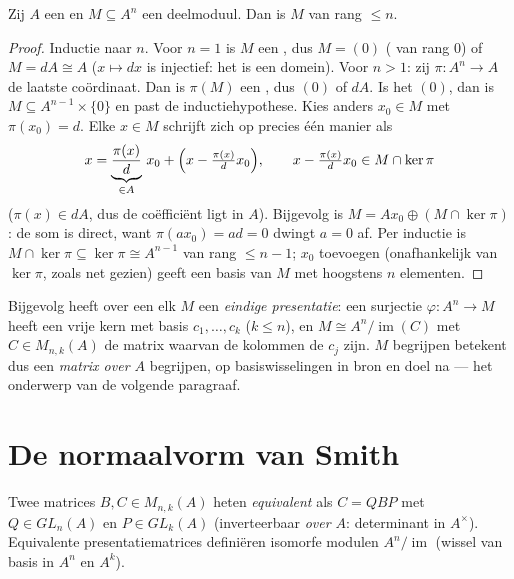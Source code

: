 \begin{theorem}\label{thm:b3:modules:submodule}
Zij $A$ een  en $M \subseteq A^n$ een deelmoduul.
Dan is $M$  van rang $\leq n$.
\end{theorem}

\begin{proof}
Inductie naar $n$. Voor $n = 1$ is $M$ een , dus $M = (0)$
( van rang $0$) of $M = dA \cong A$ ($x \mapsto dx$ is
injectief: het is een domein). Voor $n > 1$: zij $\pi \colon A^n
\to A$ de laatste coördinaat. Dan is $\pi(M)$ een , dus $(0)$
of $dA$. Is het $(0)$, dan is $M \subseteq A^{n-1} \times \{0\}$ en
past de inductiehypothese. Kies anders $x_0 \in M$ met $\pi(x_0) =
d$. Elke $x \in M$ schrijft zich op precies één manier als
\[
x = \underbrace{\frac{\pi(x)}{d}}_{\in A}\, x_0 +
\Bigl(x - \tfrac{\pi(x)}d x_0\Bigr),
\qquad x - \tfrac{\pi(x)}d x_0 \in M \cap \ker\pi
\]
($\pi(x) \in dA$, dus de coëfficiënt ligt in $A$). Bijgevolg is $M
= Ax_0 \oplus (M \cap \ker \pi)$: de som is direct, want
$\pi(ax_0) = ad = 0$ dwingt $a = 0$ af. Per inductie is $M \cap
\ker\pi \subseteq \ker \pi \cong A^{n-1}$  van rang $\leq n -
1$; $x_0$ toevoegen (onafhankelijk van $\ker\pi$, zoals net
gezien) geeft een basis van $M$ met hoogstens $n$ elementen.
\end{proof}

\begin{remark}\label{rem:b3:modules:presentation}
Bijgevolg heeft over een  elk  $M$ een \emph{eindige presentatie}: een surjectie
$\varphi\colon A^n \to M$ heeft een vrije kern met basis $c_1,
\dots, c_k$ ($k \leq n$), en $M \cong A^n / \operatorname{im}(C)$
met $C \in M_{n,k}(A)$ de matrix waarvan de kolommen de $c_j$ zijn.
$M$ begrijpen betekent dus een \emph{matrix over $A$} begrijpen, op
basiswisselingen in bron en doel na --- het onderwerp van de
volgende paragraaf.
\end{remark}

\section{De normaalvorm van Smith}

\begin{definition}\label{def:b3:modules:equivalence}
Twee matrices $B, C \in M_{n,k}(A)$ heten \emph{equivalent} als $C
= QBP$ met $Q \in GL_n(A)$ en $P \in GL_k(A)$ (inverteerbaar
\emph{over $A$}: determinant in $A^\times$). Equivalente
presentatiematrices definiëren isomorfe modulen $A^n/
\operatorname{im}$ (wissel van basis in $A^n$ en $A^k$).
\end{definition}

